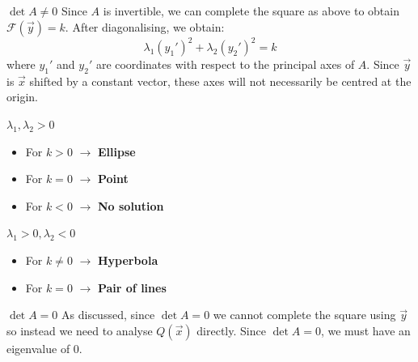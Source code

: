 \documentclass[../main.tex]{subfiles}
\begin{document}
\begin{proofcases}
  \begin{case}{$\det A \neq0$}
    Since $A$ is invertible, we can complete the square as above to obtain $\mathcal{F}(\vec{y}) = k$.
    After diagonalising, we obtain:
    \[
      \lambda_1 (y_1')^2 + \lambda_2 (y_2')^2 = k
    \]
    where $y_1'$ and $y_2'$ are coordinates with respect to the principal axes of $A$.
    Since $\vec{y}$ is $\vec{x}$ shifted by a constant vector, these axes will not necessarily be centred at the origin.
    \begin{proofcases}
      \begin{case}{$\lambda_1, \lambda_2 > 0$}
        \begin{itemize}
          \item For $k > 0$ $\to$ \textbf{Ellipse}
          \item For $k = 0$ $\to$ \textbf{Point}
          \item For $k < 0$ $\to$ \textbf{No solution}
        \end{itemize}
      \end{case}
      \begin{case}{$\lambda_1 > 0, \lambda_2 < 0$}
        \begin{itemize}
          \item For $k\neq0$ $\to$ \textbf{Hyperbola}
          \item For $k = 0$ $\to$ \textbf{Pair of lines}
        \end{itemize}
      \end{case}
    \end{proofcases}
  \end{case}
  \begin{case}{$\det A = 0$}
    As discussed, since $\det A = 0$ we cannot complete the square using $\vec{y}$ so instead we need to analyse $Q(\vec{x})$ directly.
    Since $\det A = 0$, we must have an eigenvalue of 0.


\end{case}
\end{proofcases}
\end{document}
